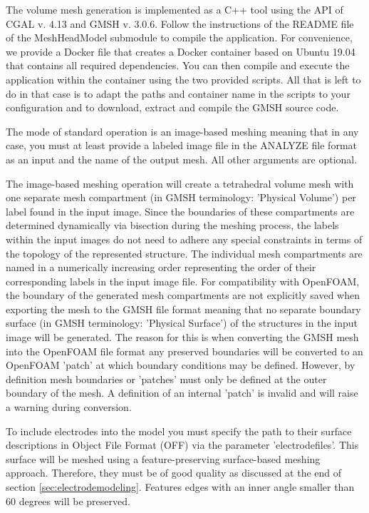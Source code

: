 The volume mesh generation is implemented as a C++ tool using the API of CGAL v. 4.13 and GMSH v. 3.0.6.
Follow the instructions of the README file of the MeshHeadModel submodule to compile the application.
For convenience, we provide a Docker file that creates a Docker container based on Ubuntu 19.04
that contains all required dependencies. You can then compile and execute the application within the container
using the two provided scripts. All that is left to do in that case is to adapt the paths and container name
in the scripts to your configuration and to download, extract and compile the GMSH source code.\par
The mode of standard operation is an image-based meshing meaning that in any case, you must at least provide a
labeled image file in the ANALYZE file format as an input and the name of the output mesh. All other arguments
are optional.\par
The image-based meshing operation will create a tetrahedral volume mesh with one separate mesh compartment
(in GMSH terminology: 'Physical Volume') per label found in the input image. Since the boundaries of these
compartments are determined dynamically via bisection during the meshing process, the labels within the 
input images do not need to adhere any special constraints in terms of the topology of the represented 
structure. The individual mesh compartments are named in a numerically increasing order representing the
order of their corresponding labels in the input image file. For compatibility with OpenFOAM, the boundary
of the generated mesh compartments are not explicitly saved when exporting the mesh to the GMSH file
format meaning that no separate boundary surface (in GMSH terminology: 'Physical Surface') of the structures
in the input image will be generated. The reason for this is when converting the GMSH mesh into the OpenFOAM file
format any preserved boundaries will be converted to an OpenFOAM 'patch' at which boundary conditions may be
defined. However, by definition mesh boundaries or 'patches' must only be defined at the outer boundary of
the mesh. A definition of an internal 'patch' is invalid and will raise a warning during conversion.\par
To include electrodes into the model you must specify the path to their surface descriptions in Object File 
Format (OFF) via the parameter 'electrodefiles'. This surface will be meshed using a feature-preserving 
surface-based meshing approach. Therefore, they must be of good quality as discussed at the end of section
\ref{sec:electrodemodeling}. Features edges with an inner angle smaller than 60 degrees will be preserved.
